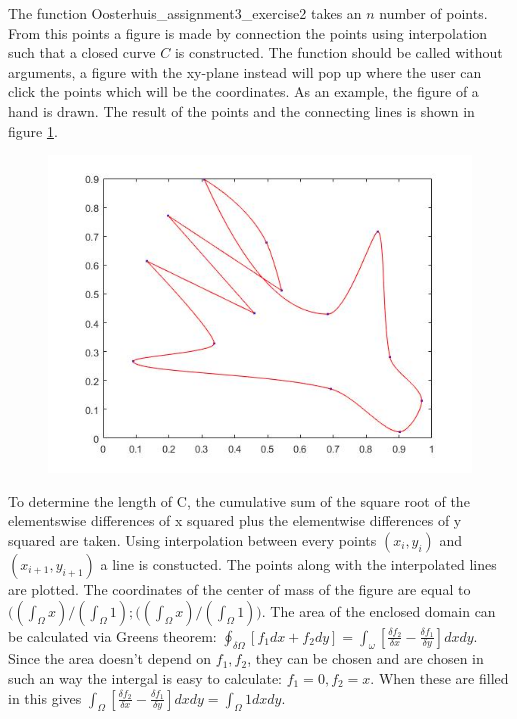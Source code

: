 \documentclass[12pt]{article}
\begin{document}
The function Oosterhuis\_assignment3\_exercise2 takes an $n$ number of points. From this points a figure is made by connection the points using interpolation such that a closed curve $C$ is constructed. The function should be called without arguments, a figure with the xy-plane instead will pop up where the user can click the points which will be the coordinates. As an example, the figure of a hand is drawn. The result of the points and the connecting lines is shown in figure \ref{ex2_1}.
\begin{figure}[H]
\centering
\includegraphics[width=0.6\linewidth,natwidth=610,natheight=642]{ex2_hand.jpg}
\caption{}
\label{ex2_1}
\end{figure}

To determine the length of C, the cumulative sum of the square root of the elementswise differences of x squared plus the elementwise differences of y squared are taken. Using interpolation between every points $(x_i,y_i)$ and  $(x_{i+1},y_{i+1})$ a line is constucted. The points along with the interpolated lines are plotted. The coordinates of the center of mass of the figure are equal to $\bigl((\int_{\Omega}x) / (\int_{\Omega}1); ((\int_{\Omega}x) / (\int_{\Omega}1)\bigr)$.
The area of the enclosed domain can be calculated via Greens theorem: $\oint_{\delta\Omega}[f_1dx+f_2dy] = \int_{\omega}[\frac{\delta f_2}{\delta x} - \frac{\delta f_1}{\delta y}]dxdy.$ Since the area doesn't depend on $f_1,f_2$, they can be chosen and are chosen in such an way the intergal is easy to calculate: $f_1=0, f_2=x$. When these are filled in this gives $\int_{\Omega} [\frac{\delta f_2}{\delta x} - \frac{\delta f_1}{\delta y}]dxdy = \int_{\Omega} 1 dxdy.$ 

\end{document}
